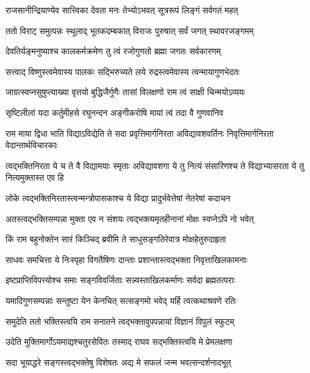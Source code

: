 \twolineshloka
{राजसानीन्द्रियाण्येव सात्त्विका देवता मनः}
{तेभ्योऽभवत् सूत्ररूपं लिङ्गं सर्वगतं महत्} %

\twolineshloka
{ततो विराट् समुत्पन्नः स्थूलाद् भूतकदम्बकात्}
{विराजः पुरुषात् सर्वं जगत् स्थावरजङ्गमम्} %

\twolineshloka
{देवतिर्यङ्मनुष्याश्च कालकर्मक्रमेण तु}
{त्वं रजोगुणतो ब्रह्मा जगतः सर्वकारणम्} %

\twolineshloka
{सत्त्वाद् विष्णुस्त्वमेवास्य पालकः सद्भिरुच्यते}
{लये रुद्रस्त्वमेवास्य त्वन्मायागुणभेदतः} %

\twolineshloka
{जाग्रत्स्वप्नसुषुप्त्याख्या वृत्तयो बुद्धिजैर्गुणैः}
{तासां विलक्षणो राम त्वं साक्षी चिन्मयोऽव्ययः} %

\twolineshloka
{सृष्टिलीलां यदा कर्तुमीहसे रघुनन्दन}
{अङ्गीकरोषि मायां त्वं तदा वै गुणवानिव} %

\threelineshloka
{राम माया द्विधा भाति विद्याऽविद्येति ते सदा}
{प्रवृत्तिमार्गनिरता अविद्यावशवर्तिनः}
{निवृत्तिमार्गनिरता वेदान्तार्थविचारकाः} %

\threelineshloka
{त्वद्भक्तिनिरता ये च ते वै विद्यामयाः स्मृताः}
{अविद्यावशगा ये तु नित्यं संसारिणश्च ते}
{विद्याभ्यासरता ये तु नित्यमुक्तास्त एव हि} %

\twolineshloka
{लोके त्वद्भक्तिनिरतास्त्वन्मन्त्रोपासकाश्च ये}
{विद्या प्रादुर्भवेत्तेषां नेतरेषां कदाचन} %

\twolineshloka
{अतस्त्वद्भक्तिसम्पन्ना मुक्ता एव न संशयः}
{त्वद्भक्त्यमृतहीनानां मोक्षः स्वप्नेऽपि नो भवेत्} %

\twolineshloka
{किं राम बहुनोक्तेन सारं किञ्चिद् ब्रवीमि ते}
{साधुसङ्गतिरेवात्र मोक्षहेतुरुदाहृता} %

\twolineshloka
{साधवः समचित्ता ये निःस्पृहा विगतैषिणः}
{दान्ताः प्रशान्तास्त्वद्भक्ता निवृत्ताखिलकामनाः} %

\twolineshloka
{इष्टप्राप्तिविपत्त्योश्च समाः सङ्गविवर्जिताः}
{सन्न्यस्ताखिलकर्माणः सर्वदा ब्रह्मतत्पराः} %

\twolineshloka
{यमादिगुणसम्पन्नाः सन्तुष्टा येन केनचित्}
{सत्सङ्गमो भवेद् यर्हि त्वत्कथाश्रवणे रतिः} %

\twolineshloka
{समुदेति ततो भक्तिस्त्वयि राम सनातने}
{त्वद्भक्तावुपपन्नायां विज्ञानं विपुलं स्फुटम्} %

\twolineshloka
{उदेति मुक्तिमार्गोऽयमाद्यश्चतुरसेवितः}
{तस्माद् राघव सद्भक्तिस्त्वयि मे प्रेमलक्षणा} %

\twolineshloka
{सदा भूयाद्धरे सङ्गस्त्वद्भक्तेषु विशेषतः}
{अद्य मे सफलं जन्म भवत्सन्दर्शनादभूत्} %

